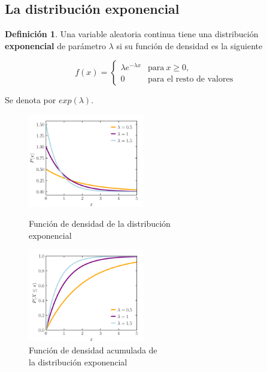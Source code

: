 \documentclass[]{book}
\theoremstyle{plain}
\theoremstyle{definition}
\newtheorem{definition}[theorem]{Definición}
\theoremstyle{definition} %
\begin{document}
\subsection{La distribución exponencial} 

\begin{definition}
  Una variable aleatoria continua tiene una distribución \textbf{exponencial} de parámetro 
  $\lambda$ si su función de densidad es la siguiente
  
  \[f(x)=\begin{cases}
    \lambda e^{-\lambda x} &\mathrm {para} \ x\geq 0,\\
     0&\text {para el resto de valores}
  \end{cases}\]
  
  Se denota por \(exp(\lambda)\).
\end{definition}

\begin{figure}[htbp]
  \begin{minipage}{0.5\linewidth}
  \centering
  \includegraphics[width=2in,height=\textheight]{img/exponential_distribution1.png}
  \caption{Función de densidad de la distribución\\ exponencial}
  \end{minipage}%
  \begin{minipage}{0.5\linewidth}
  \centering
  \includegraphics[width=2in,height=\textheight]{img/exponential_distribution2.png}
  \caption{Función de densidad acumulada de \\la distribución exponencial}
  \end{minipage}

\end{figure} 
\end{document}
